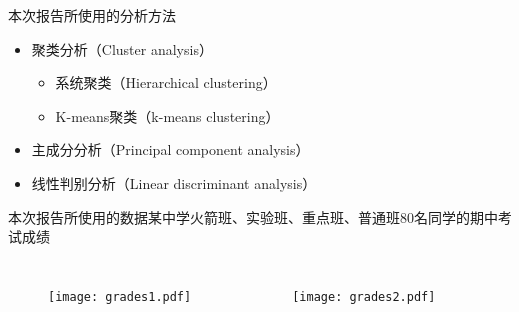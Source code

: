 
\begin{frame}
\titlepage
\end{frame}

\begin{frame}{本次报告所使用的分析方法}
    \begin{itemize}%
        \item 聚类分析（Cluster analysis）
        \begin{itemize}
          \item 系统聚类（Hierarchical clustering）
          \item K-means聚类（k-means clustering）
        \end{itemize}

        \item 主成分分析（Principal component analysis）

        \item 线性判别分析（Linear discriminant analysis）
    \end{itemize}
\strut
\end{frame}

\begin{frame}{本次报告所使用的数据}{某中学火箭班、实验班、重点班、普通班80名同学的期中考试成绩}
  \begin{columns}
    \begin{figure}
      \texttt{[image: grades1.pdf]}
    \end{figure}

    \begin{figure}
      \texttt{[image: grades2.pdf]}
    \end{figure}
  \end{columns}
  \strut
\end{frame}
